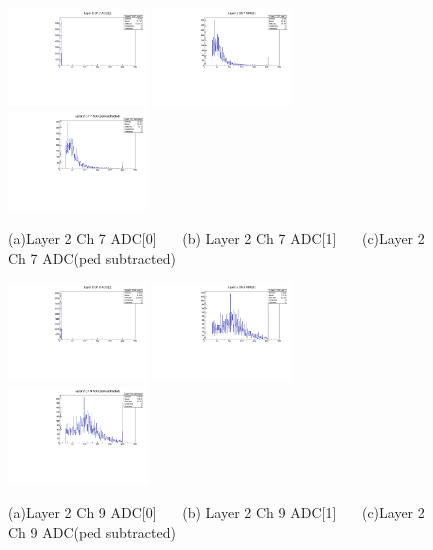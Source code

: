 \documentclass[a4paper,11pt]{article}
\theoremstyle{mytheor}
\begin{document}
\begin{figure}[H] 
\vspace*{-0.3cm} 
\includegraphics[width=0.33\textwidth,scale=0.5,trim=0 0 0 0,clip]{plotsdir/file0_muons-Layer2_Ch7_adc0-1.pdf} 
\includegraphics[width=0.33\textwidth,scale=0.5,trim=0 0 0 0,clip]{plotsdir/file0_muons-Layer2_Ch7_adc1-1.pdf} 
\includegraphics[width=0.33\textwidth,scale=0.5,trim=0 0 0 0,clip]{plotsdir/file0_muons-Layer2_Ch7_adcPedsub-1.pdf} 
\caption{(a)Layer 2 Ch 7 ADC[0] ~~~(b) Layer 2 Ch 7 ADC[1] ~~~(c)Layer 2 Ch 7 ADC(ped subtracted) } 
\end{figure} 
\begin{figure}[H] 
\vspace*{-0.3cm} 
\includegraphics[width=0.33\textwidth,scale=0.5,trim=0 0 0 0,clip]{plotsdir/file0_muons-Layer2_Ch9_adc0-1.pdf} 
\includegraphics[width=0.33\textwidth,scale=0.5,trim=0 0 0 0,clip]{plotsdir/file0_muons-Layer2_Ch9_adc1-1.pdf} 
\includegraphics[width=0.33\textwidth,scale=0.5,trim=0 0 0 0,clip]{plotsdir/file0_muons-Layer2_Ch9_adcPedsub-1.pdf} 
\caption{(a)Layer 2 Ch 9 ADC[0] ~~~(b) Layer 2 Ch 9 ADC[1] ~~~(c)Layer 2 Ch 9 ADC(ped subtracted) } 
\end{figure} 
\end{document}
